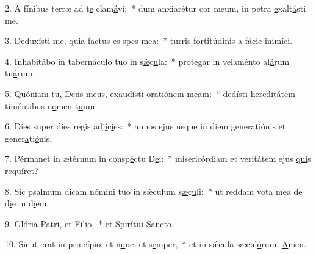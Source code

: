 2. A fínibus terræ ad t\uline{e} clam\uline{á}vi:~* dum anxiarétur cor meum, in petra \uline{e}xalt\uline{á}sti me.\par 
3. Deduxísti me, quia factus \uline{e}s spes m\uline{e}a:~* turris fortitúdinis a fácie \uline{i}nim\uline{í}ci.\par 
4. Inhabitábo in tabernáculo tuo in s\uline{ǽ}c\uline{u}la:~* prótegar in velaménto al\uline{á}rum tu\uline{á}rum.\par 
5. Quóniam tu, Deus meus, exaudísti orati\uline{ó}nem m\uline{e}am:~* dedísti hereditátem timéntibus n\uline{o}men t\uline{u}um.\par 
6. Dies super dies regis adj\uline{í}c\uline{i}es:~* annos ejus usque in diem generatiónis et gener\uline{a}ti\uline{ó}nis.\par 
7. Pérmanet in ætérnum in consp\uline{é}ctu D\uline{e}i:~* misericórdiam et veritátem ejus \uline{qui}s re\uline{quí}ret?\par 
8. Sic psalmum dicam nómini tuo in sǽculum s\uline{ǽ}c\uline{u}li:~* ut reddam vota mea de d\uline{i}e in d\uline{i}em.\par 
9. Glória Patri, et F\uline{í}l\uline{i}o,~* et Spir\uline{í}tui S\uline{a}ncto.\par 
10. Sicut erat in princípio, et n\uline{u}nc, et s\uline{e}mper,~* et in sǽcula sæcul\uline{ó}rum. \uline{A}men.\par 
